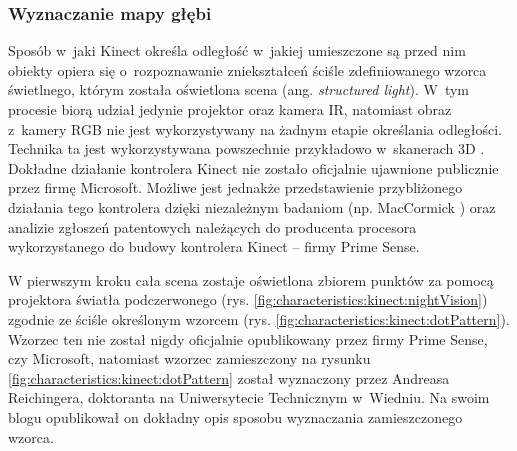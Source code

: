 \subsubsection*{Wyznaczanie mapy głębi}
Sposób w~jaki Kinect określa odległość w~jakiej umieszczone są przed nim obiekty opiera się o~rozpoznawanie zniekształceń ściśle zdefiniowanego wzorca świetlnego, którym została oświetlona scena (ang. \emph{structured light}). W~tym procesie biorą udział jedynie projektor oraz kamera IR, natomiast obraz z~kamery RGB nie jest wykorzystywany na żadnym etapie określania odległości. Technika ta jest wykorzystywana powszechnie przykładowo w~skanerach 3D  . Dokładne działanie kontrolera Kinect nie zostało oficjalnie ujawnione publicznie przez firmę Microsoft. Możliwe jest jednakże przedstawienie przybliżonego działania tego kontrolera dzięki niezależnym badaniom (np. MacCormick \cite{MacCormick2011}) oraz analizie zgłoszeń patentowych \cite{patent:20080106746,patent:20100020078,patent:20100118123} należących do producenta procesora wykorzystanego do budowy kontrolera Kinect -- firmy Prime Sense.
																															
W pierwszym kroku cała scena zostaje oświetlona zbiorem punktów za pomocą projektora światła podczerwonego (rys. \ref{fig:characteristics:kinect:nightVision}) zgodnie ze ściśle określonym wzorcem (rys. \ref{fig:characteristics:kinect:dotPattern}). Wzorzec ten nie został nigdy oficjalnie opublikowany przez firmy Prime Sense, czy Microsoft, natomiast wzorzec zamieszczony na rysunku \ref{fig:characteristics:kinect:dotPattern} został wyznaczony przez Andreasa Reichingera, doktoranta na Uniwersytecie Technicznym w~Wiedniu. Na swoim blogu opublikował on dokładny opis sposobu wyznaczania zamieszczonego wzorca.
																															
